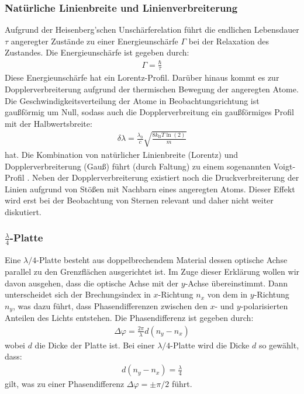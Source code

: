 \documentclass[11pt, a4paper]{article}
\begin{document}
\subsubsection{Natürliche Linienbreite und Linienverbreiterung}
Aufgrund der Heisenberg'schen Unschärferelation führt die endlichen Lebensdauer $\tau$ angeregter Zustände zu einer Energieunschärfe $\Gamma$ bei der Relaxation des Zustandes.
Die Energieunschärfe ist gegeben durch:
\begin{align*}
	\Gamma = \frac{\hbar}{\tau}
\end{align*}
Diese Energieunschärfe hat ein Lorentz-Profil.
Darüber hinaus kommt es zur Dopplerverbreiterung aufgrund der thermischen Bewegung der angeregten Atome.
Die Geschwindigkeitsverteilung der Atome in Beobachtungsrichtung ist gaußförmig um Null, sodass auch die Dopplerverbreitung ein gaußförmiges Profil mit der Halbwertsbreite:
\begin{align}
	\delta \lambda = \frac{\lambda_0}{c} \sqrt{\frac{8 k_\mathrm{B} T \ln(2)}{m}}
	\label{eq:doppler}
\end{align}
hat.
Die Kombination von natürlicher Linienbreite (Lorentz) und Dopplerverbreiterung (Gauß) führt (durch Faltung) zu einem sogenannten Voigt-Profil \cite{siegmann}.
Neben der Dopplerverbreiterung existiert noch die Druckverbreiterung der Linien aufgrund von Stößen mit Nachbarn eines angeregten Atoms.
Dieser Effekt wird erst bei der Beobachtung von Sternen relevant und daher nicht weiter diskutiert.

\subsubsection{$\frac{\lambda}{4}$-Platte}
Eine $\lambda/4$-Platte besteht aus doppelbrechendem Material dessen optische Achse parallel zu den Grenzflächen ausgerichtet ist.
Im Zuge dieser Erklärung wollen wir davon ausgehen, dass die optische Achse mit der $y$-Achse übereinstimmt.
Dann unterscheidet sich der Brechungsindex in $x$-Richtung $n_x$ von dem in $y$-Richtung $n_y$, was dazu führt, dass Phasendifferenzen zwischen den $x$- und $y$-polarisierten Anteilen des Lichts entstehen.
Die Phasendifferenz ist gegeben durch:
\begin{align*}
	\Delta \varphi = \frac{2 \pi}{\lambda} d \left(n_y - n_x\right)
\end{align*}
wobei $d$ die Dicke der Platte ist.
Bei einer $\lambda / 4$-Platte wird die Dicke $d$ so gewählt, dass:
\begin{align*}
	d (n_y - n_x) = \frac{\lambda}{4}
\end{align*}
gilt, was zu einer Phasendifferenz $\Delta \varphi = \pm \pi / 2$ führt.
\end{document}
